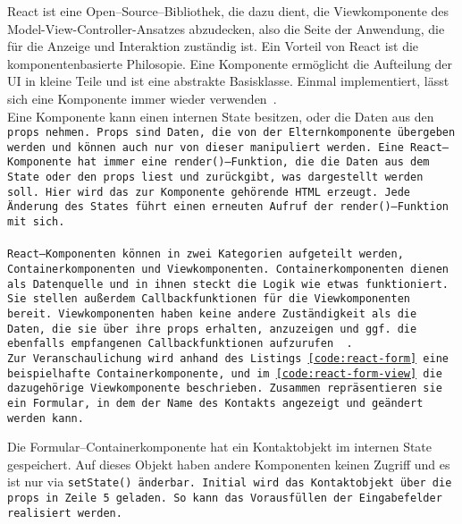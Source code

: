 React ist eine Open--Source--Bibliothek, die dazu dient, die Viewkomponente des Model-View-Controller-Ansatzes abzudecken, also die Seite der Anwendung, die für die Anzeige und Interaktion zuständig ist.
Ein Vorteil von React ist die komponentenbasierte Philosopie. Eine Komponente ermöglicht die Aufteilung der \gls{UI} in kleine Teile und ist eine abstrakte Basisklasse. Einmal implementiert, lässt sich eine Komponente immer wieder verwenden~\cite{react}.\\
%
Eine Komponente kann einen internen State besitzen, oder die Daten aus den \tt{props} nehmen.
\tt{Props} sind Daten, die von der Elternkomponente übergeben werden und können auch nur von dieser manipuliert werden.
Eine React--Komponente hat immer eine \tt{render()}--Funktion, die die Daten aus dem State oder den \tt{props} liest und zurückgibt, was dargestellt werden soll.
Hier wird das zur Komponente gehörende \gls{HTML} erzeugt. Jede Änderung des States führt einen erneuten Aufruf der \tt{render()}--Funktion mit sich.\\\\
%
%
React--Komponenten können in zwei Kategorien aufgeteilt werden, Containerkomponenten und Viewkomponenten.
Containerkomponenten dienen als Datenquelle und in ihnen steckt die Logik wie etwas funktioniert.
Sie stellen außerdem Callbackfunktionen für die Viewkomponenten bereit.
Viewkomponenten haben keine andere Zuständigkeit als die Daten, die sie über ihre \tt{props} erhalten, anzuzeigen und ggf. die ebenfalls empfangenen Callbackfunktionen aufzurufen ~\cite{react-components}.\\
Zur Veranschaulichung wird anhand des Listings \ref{code:react-form} eine beispielhafte Containerkomponente, und im \autoref{code:react-form-view} die dazugehörige Viewkomponente beschrieben.
Zusammen repräsentieren sie ein Formular, in dem der Name des Kontakts angezeigt und geändert werden kann.
%
\begin{center}
  
\end{center}
%
Die Formular--Containerkomponente hat ein Kontaktobjekt im internen State gespeichert.
Auf dieses Objekt haben andere Komponenten keinen Zugriff und es ist nur via \tt{setState()} änderbar.
Initial wird das Kontaktobjekt über die \tt{props} in Zeile 5 geladen. So kann das Vorausfüllen der Eingabefelder realisiert werden.\\
